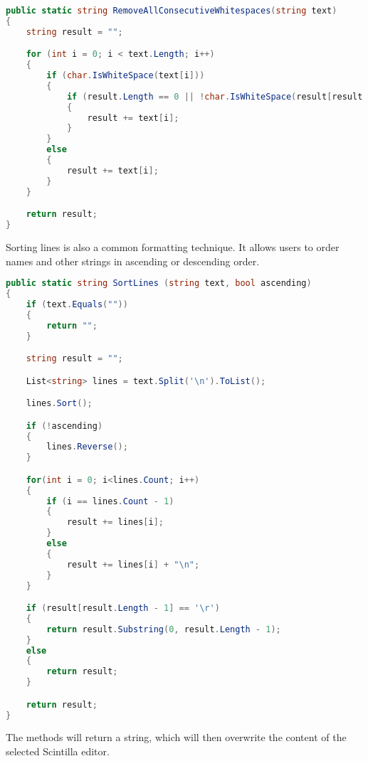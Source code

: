 \begin{lstlisting}[language=csharp, caption={Removing consecutive whitespaces through the RemoveAllConsecutiveWhitespaces() method from the FormattingService class}]
public static string RemoveAllConsecutiveWhitespaces(string text)
{
    string result = "";

    for (int i = 0; i < text.Length; i++)
    {
        if (char.IsWhiteSpace(text[i]))
        {
            if (result.Length == 0 || !char.IsWhiteSpace(result[result.Length - 1]) || text[i] == '\n' || text[i] == '\r')
            {
                result += text[i];
            }
        }
        else
        {
            result += text[i];
        }
    }

    return result;
}
\end{lstlisting}

Sorting lines is also a common formatting technique. It allows users to order names and other strings in ascending or descending order.

\begin{lstlisting}[language=csharp, caption={Sorting lines ascending or descending through the SortLines() method from the FormattingService class}]
public static string SortLines (string text, bool ascending)
{
    if (text.Equals(""))
    {
        return "";
    }

    string result = "";

    List<string> lines = text.Split('\n').ToList();

    lines.Sort();

    if (!ascending)
    {
        lines.Reverse();
    }

    for(int i = 0; i<lines.Count; i++)
    {
        if (i == lines.Count - 1)
        {
            result += lines[i];
        }
        else
        {
            result += lines[i] + "\n";
        }
    }

    if (result[result.Length - 1] == '\r')
    {
        return result.Substring(0, result.Length - 1);
    }
    else
    {
        return result;
    }

    return result;
}
\end{lstlisting}

The methods will return a string, which will then overwrite the content of the selected Scintilla editor.